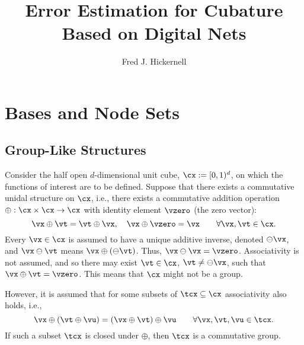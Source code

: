 \documentclass[]{elsarticle}
\theoremstyle{definition}
\begin{document}
\begin{frontmatter}

\title{Error Estimation for Cubature Based on Digital Nets}
\author{Fred J. Hickernell}
\address{Room E1-208, Department of Applied Mathematics, Illinois Institute of Technology,\\ 10 W.\ 32$^{\text{nd}}$ St., Chicago, IL 60616}
\begin{abstract} 
\end{abstract}

\begin{keyword}


\end{keyword}
\end{frontmatter}

\section{Bases and Node Sets}

\subsection{Group-Like Structures}
Consider the half open $d$-dimensional unit cube, $\cx:=[0,1)^d$, on which the functions of interest are to be defined. Suppose that there exists a commutative unidal structure on $\cx$, i.e., there exists a commutative addition operation $\oplus:\cx \times \cx \to \cx$ with identity element $\vzero$ (the zero vector): 
\[
\vx \oplus \vt = \vt \oplus \vx, \quad \vx \oplus \vzero =\vx \qquad \forall \vx,\vt \in \cx.
\]
Every $\vx \in \cx$ is assumed to have a unique additive inverse,  denoted $\ominus \vx$, and $\vx \ominus \vt$ means $\vx \oplus (\ominus \vt)$.  Thus, $\vx \ominus \vx = \vzero$.  Associativity is not assumed, and so there may exist $\vt \in \cx$, $\vt \ne \ominus \vx$, such that $\vx \oplus \vt = \vzero$.  This means that $\cx$ might not be a group.  

However, it is assumed that for some subsets of $\tcx \subseteq \cx$ associativity also holds, i.e., 
\begin{equation} \label{assocprop}
\vx \oplus (\vt \oplus \vu) = (\vx \oplus \vt) \oplus \vu \qquad \forall \vx,\vt,\vu \in \tcx.
\end{equation}
If such a subset $\tcx$ is closed under $\oplus$, then $\tcx$ is a commutative group.
\end{document}
